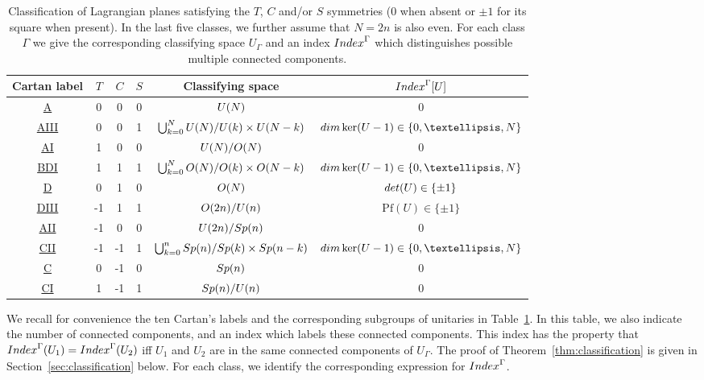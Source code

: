 \documentclass[11pt]{amsart}
\numberwithin{equation}{section} %
\newcommand\1{{\mathds 1}}
\def\U{{\rm U}}
\def\O{{\rm O}}
\def\Sp{{\rm Sp}}
\def\Index{{\rm Index}}
\def\dim{{\rm dim }}
\def\det{{\rm det}}
\begin{document}
\begin{table}[htb] \label{table:main}
    \begin{tabular}{|c|c|c|c||c||c|}
        \hline
        Cartan label & $T$ & $C$ & $S$ & Classifying space &  $\Index^\Gamma[U]$\\
        \hline
        \hline
        \hyperref[sec:class_A]{A} & 0 & 0 & 0 &  $\U(N)$ & $0$ \\
        \hline
        \hyperref[sec:class_AIII]{AIII} & 0 & 0 & 1 & $\bigcup_{k=0}^N \U(N) / \U(k) \times \U(N -k)$ & $\dim \ker (U-1) \in \{0,\ldots, N\}$ \\
        \hline
        \hline
        \hyperref[sec:class_AI]{AI} & 1 & 0 & 0  & $\U(N)/\O(N)$ & 0 \\
        \hline 
        \hyperref[sec:class_BDI]{BDI} & 1 & 1 & 1 & $\bigcup_{k=0}^N \O(N) / \O(k) \times \O(N-k)$ & $\dim \ker (U-1) \in \{0,\ldots, N\}$ \\
        \hline 
        \hyperref[sec:class_D]{D} & 0 & 1 & 0 & $\O(N)$ & $\det (U) \in \{\pm 1\}$ \\
        \hline
        \hyperref[sec:class_DIII]{DIII} & -1 & 1 & 1 & $\O(2n)/ \U(n)$ & $\mathrm{Pf} (U) \in \{\pm 1\}$ \\
        \hline
        \hyperref[sec:class_AII]{AII} & -1 & 0 & 0 & $\U(2n) / \Sp(n)$ & 0 \\
        \hline 
        \hyperref[sec:class_CII]{CII} & -1 & -1 & 1 & $ \bigcup_{k=0}^n \Sp(n)/\Sp(k) \times \Sp(n-k)$ & $\dim \ker (U-1) \in \{0,\ldots, N\}$\\
        \hline
        \hyperref[sec:class_C]{C} & 0 & -1 & 0 & $ \Sp(n)$ & 0 \\
        \hline
        \hyperref[sec:class_CI]{CI} & 1 & -1 & 1 & $\Sp(n)/\U(n)$ & 0 \\
        \hline
    \end{tabular}
    \caption{Classification of Lagrangian planes satisfying the $T$, $C$ and/or $S$ symmetries ($0$ when absent or $\pm1$ for its square when present). In the last five classes, we further assume that $N = 2n$ is also even. For each class $\Gamma$ we give the corresponding classifying space $U_\Gamma$ and an index $\Index^\Gamma$ which distinguishes possible multiple connected components.}
    \label{tab:classification}
\end{table}


We recall for convenience the ten Cartan's labels and the corresponding subgroups of unitaries in Table~\ref{tab:classification}. In this table, we also indicate the number of connected components, and an index which labels these connected components. This index has the property that $\Index^\Gamma(U_1) = \Index^\Gamma(U_2)$ iff $U_1$ and $U_2$ are in the same connected components of $U_\Gamma$. 
The proof of Theorem~\ref{thm:classification} is given in Section~\ref{sec:classification} below. For each class, we identify the corresponding expression for $\Index^\Gamma$.
\end{document}
